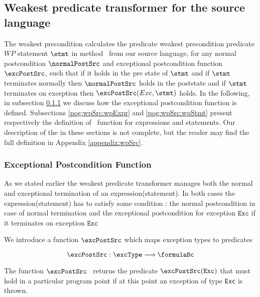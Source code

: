 


\subsection{Weakest predicate transformer for the source language } \label{pog:wpSrc}

The weakest precondition calculates  the predicate weakest precondition predicate $WP$  statement $\stmt$ in method \methodd \ from our source language,
for any normal postcondition $\normalPostSrc$ and exceptional postcondition function $\excPostSrc$, 
 such that if it holds in the pre state of $\stmt$ and   if $\stmt$ terminates normally then $\normalPostSrc$  holds in the poststate and
 if $\stmt$ terminates on exception \Exc{} then $\excPostSrc(Exc, \stmt)$ holds. 
In the following, in  subsection   \ref{pog:wpSrc:excPost} we discuss how the exceptional postcondition function is defined.
Subsections \ref{pog:wpSrc:wpExpr} and  \ref{pog:wpSrc:wpStmt} present respectively
 the definition of \wpName \  function for expressions and statements.  Our description of the \wpName{} in these sections is not complete,
but the reader may find the full definition in Appendix \ref{appendix:wpSrc}. 
 



\subsubsection{Exceptional Postcondition Function}\label{pog:wpSrc:excPost}

As we stated earlier the weakest predicate transformer manages both the normal and
 exceptional termination of  an expression(statement). 
In both cases the expression(statement) has to satisfy some condition : 
the normal postcondition in case of normal termination and the exceptional postcondition
for exception $\texttt{Exc}$ if it terminates on exception $\texttt{Exc}$


We introduce a function $\excPostSrc$  which maps exception types to predicates  

$$ \excPostSrc :  \excType \longrightarrow   \formulaBc $$ 



The function $\excPostSrc$ \ returns the predicate $\excPostSrc (\mbox{\rm\texttt{Exc}}) $ that must hold in a particular program point if
 at this point an exception of type \mbox{\rm\texttt{Exc}} is thrown.





